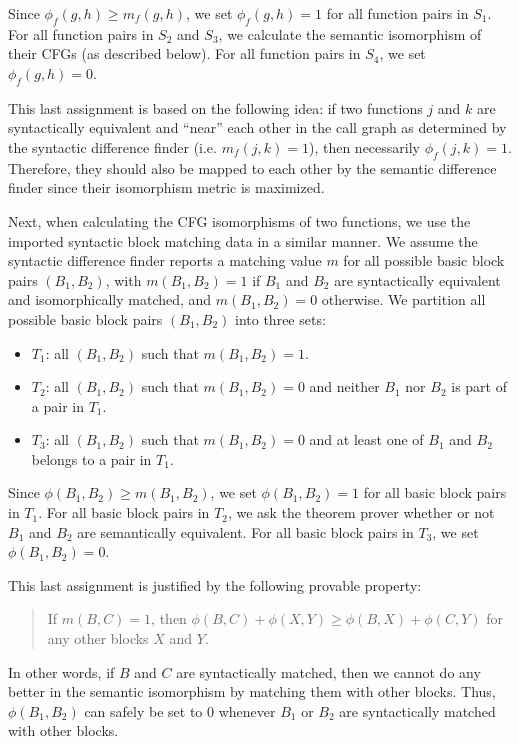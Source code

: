 \documentclass[11pt,twocolumn]{article}
\begin{document}
Since $\phi_f(g,h) \geq m_f(g,h)$, we set $\phi_f(g,h)=1$ for all function pairs in $S_1$.
For all function pairs in $S_2$ and $S_3$, we calculate the semantic isomorphism of their CFGs (as described below).
For all function pairs in $S_4$, we set $\phi_f(g,h)=0$.  

This last assignment is based on the following idea: if two functions $j$ and $k$ are syntactically equivalent and ``near'' each other in the call graph as determined by the syntactic difference finder (i.e. $m_f(j,k) = 1$), then  necessarily $\phi_f(j,k) = 1$.  Therefore, they should also be mapped to each other by the semantic difference finder since their isomorphism metric is maximized.  

Next, when calculating the CFG isomorphisms of two functions, we use the imported syntactic block matching data in a similar manner.   We assume the syntactic difference finder reports a matching value $m$ for all possible basic block pairs $(B_1, B_2)$, with $m(B_1,B_2) = 1$ if $B_1$ and $B_2$ are syntactically equivalent and isomorphically matched, and $m(B_1,B_2)=0$ otherwise.
We partition all possible basic block pairs $(B_1,B_2) $ into three sets: 
\begin{itemize}
\item $T_1$: all $(B_1,B_2)$ such that $m(B_1,B_2) = 1$.
\item $T_2$: all $(B_1,B_2)$ such that $m(B_1,B_2) = 0$ and neither $B_1$ nor $B_2$ is part of a pair in $T_1$.
\item $T_3$: all $(B_1,B_2)$ such that $m(B_1,B_2) = 0$ and at least one of $B_1$ and $B_2$ belongs to a pair in $T_1$.
\end{itemize}

Since $\phi(B_1,B_2) \geq m(B_1,B_2)$, we set $\phi(B_1,B_2) = 1$ for all basic block pairs in $T_1$. 
For all basic block pairs in $T_2$, we ask the theorem prover whether or not $B_1$ and $B_2$ are semantically equivalent.
For all basic block pairs in $T_3$, we set $\phi(B_1,B_2) = 0$.  

This last assignment is justified by the following provable property:
 
\begin{quote} If $m(B,C) = 1$, then $\phi(B,C) + \phi(X,Y) \geq \phi(B,X) + \phi(C,Y)$ for any other blocks $X$ and $Y$.
\end{quote}

In other words, if $B$ and $C$ are syntactically matched, then we cannot do any better in the semantic isomorphism by matching them with other blocks.  Thus, $\phi(B_1,B_2)$ can safely be set to 0 whenever $B_1$ or $ B_2$ are syntactically matched with other blocks.
\end{document}
